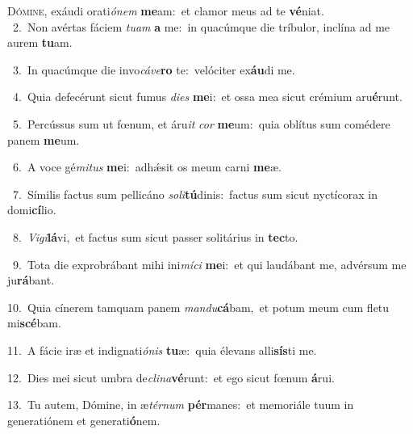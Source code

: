 \lettrine{\initial\textcolor{\initialcolor}{D}}{ómine,} exáudi orati\-\textit{ó}\-\textit{nem} \textbf{me}\-am:~\star et clamor meus ad te \textbf{vé}\-niat.\\
{\numbfont\textcolor{\numbcolor}{~2.}}~Non avértas fáciem \textit{tu}\-\textit{am} \textbf{a} me:~\star in quacúmque die tríbulor, inclína ad me aurem \textbf{tu}\-am.\par
{\numbfont\textcolor{\numbcolor}{~3.}}~In quacúmque die invo\-\textit{cá}\-\textit{ve}\textbf{ro} te:~\star velóciter ex\-\textbf{áu}\-di me.\par
{\numbfont\textcolor{\numbcolor}{~4.}}~Quia defecérunt sicut fumus \textit{di}\-\textit{es} \textbf{me}\-i:~\star et ossa mea sicut crémium aru\-\textbf{é}\-runt.\par
{\numbfont\textcolor{\numbcolor}{~5.}}~Percússus sum ut fœnum, et áru\textit{it} \textit{cor} \textbf{me}\-um:~\star quia oblítus sum comédere panem \textbf{me}\-um.\par
{\numbfont\textcolor{\numbcolor}{~6.}}~A voce gé\-\textit{mi}\-\textit{tus} \textbf{me}\-i:~\star adhǽsit os meum carni \textbf{me}\-æ.\par
{\numbfont\textcolor{\numbcolor}{~7.}}~Símilis factus sum pellicáno \textit{so}\-\textit{li}\textbf{tú}dinis:~\star factus sum sicut nyctícorax in domi\-\textbf{cí}\-lio.\par
{\numbfont\textcolor{\numbcolor}{~8.}}~\-\textit{Vi}\-\textit{gi}\textbf{lá}vi,~\star et factus sum sicut passer solitárius in \textbf{tec}\-to.\par
{\numbfont\textcolor{\numbcolor}{~9.}}~Tota die exprobrábant mihi ini\-\textit{mí}\-\textit{ci} \textbf{me}\-i:~\star et qui laudábant me, advérsum me ju\-\textbf{rá}\-bant.\par
{\numbfont\textcolor{\numbcolor}{10.}}~Quia cínerem tamquam panem \textit{man}\-\textit{du}\textbf{cá}bam,~\star et potum meum cum fletu mi\-\textbf{scé}\-bam.\par
{\numbfont\textcolor{\numbcolor}{11.}}~A fácie iræ et indignati\-\textit{ó}\-\textit{nis} \textbf{tu}\-æ:~\star quia élevans alli\-\textbf{sís}\-ti me.\par
{\numbfont\textcolor{\numbcolor}{12.}}~Dies mei sicut umbra de\-\textit{cli}\-\textit{na}\textbf{vé}runt:~\star et ego sicut fœnum \textbf{á}\-rui.\par
{\numbfont\textcolor{\numbcolor}{13.}}~Tu autem, Dómine, in æ\-\textit{tér}\-\textit{num} \textbf{pér}\-manes:~\star et memoriále tuum in generatiónem et generati\-\textbf{ó}\-nem.\par
